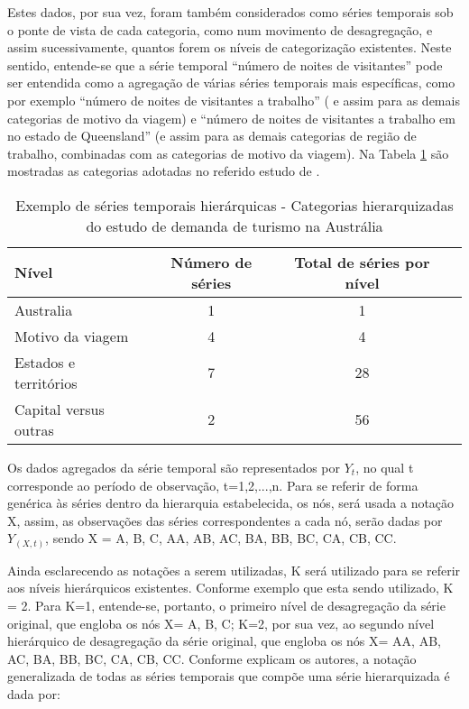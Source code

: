 \documentclass[
	12pt,				%
	openright,			%
	twoside,			%
	a4paper,			%
	english,			%
	french,				%
	spanish,			%
	brazil				%
	]{abntex2}
\begin{document}
Estes dados, por sua vez, foram também considerados como séries temporais sob o ponte de vista de cada categoria, como num movimento de desagregação, e assim sucessivamente, quantos forem os níveis de categorização existentes. Neste sentido, entende-se que a série temporal “número de noites de visitantes” pode ser entendida como a agregação de várias séries temporais mais específicas, como por exemplo “número de noites de visitantes a trabalho” ( e assim para as demais categorias de motivo da viagem) e “número de noites de visitantes a trabalho em no estado de Queensland” (e assim para as demais categorias de região de trabalho, combinadas com as categorias de motivo da viagem). Na Tabela \ref{tab:exemplohierarquia} são mostradas as categorias adotadas no referido estudo de .

\begin{table}[h]
\ABNTEXfontereduzida\caption{Exemplo de séries temporais hierárquicas - Categorias hierarquizadas do estudo de demanda de turismo na Austrália}
\label{tab:exemplohierarquia}
\centering
\begin{tabular}{l c c c}

\toprule

Nível & Número de séries & Total de séries por nível \\
\midrule
Australia & 1 & 1\\
Motivo da viagem & 4 & 4\\
Estados e territórios & 7 & 28\\
Capital versus outras & 2 & 56\\

\bottomrule
\end{tabular}
\end{table}

Os dados agregados da série temporal são representados por $Y_t$, no qual t corresponde ao período de observação, t=1,2,...,n. Para se referir de forma genérica às séries dentro da hierarquia estabelecida, os nós, será usada a notação X, assim, as observações das séries correspondentes a cada nó, serão dadas por $Y_{(X,t)}$, sendo X = A, B, C, AA, AB, AC, BA, BB, BC, CA, CB, CC. 

Ainda esclarecendo as notações a serem utilizadas, K será utilizado para se referir aos níveis hierárquicos existentes. Conforme exemplo que esta sendo utilizado, K = 2. Para K=1, entende-se, portanto, o primeiro nível de desagregação da série original, que engloba os nós X= A, B, C; K=2, por sua vez, ao segundo nível hierárquico de desagregação da série original, que engloba os nós X= AA, AB, AC, BA, BB, BC, CA, CB, CC.
Conforme explicam os autores, a notação generalizada de todas as séries temporais que compõe uma série hierarquizada é dada por:
\end{document}
